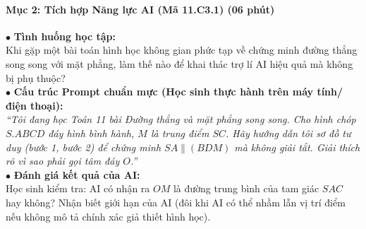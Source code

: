 \documentclass[12pt, a4paper]{article}
\begin{document}
\begin{center}
\end{center}

\paragraph{Mục 2: Tích hợp Năng lực AI (Mã 11.C3.1) (06 phút)}

\begin{aibox}
    $\bullet$ \textbf{Tình huống học tập:}\\
    Khi gặp một bài toán hình học không gian phức tạp về chứng minh đường thẳng song song với mặt phẳng, làm thế nào để khai thác trợ lí AI hiệu quả mà không bị phụ thuộc?\\
    $\bullet$ \textbf{Cấu trúc Prompt chuẩn mực (Học sinh thực hành trên máy tính/điện thoại):}\\
    \textit{``Tôi đang học Toán 11 bài Đường thẳng và mặt phẳng song song. Cho hình chóp $S.ABCD$ đáy hình bình hành, $M$ là trung điểm $SC$. Hãy hướng dẫn tôi sơ đồ tư duy (bước 1, bước 2) để chứng minh $SA \parallel (BDM)$ mà không giải tắt. Giải thích rõ vì sao phải gọi tâm đáy $O$.''}\\
    $\bullet$ \textbf{Đánh giá kết quả của AI:}\\
    Học sinh kiểm tra: AI có nhận ra $OM$ là đường trung bình của tam giác $SAC$ hay không? Nhận biết giới hạn của AI (đôi khi AI có thể nhầm lẫn vị trí điểm nếu không mô tả chính xác giả thiết hình học).
\end{aibox}
\end{document}
